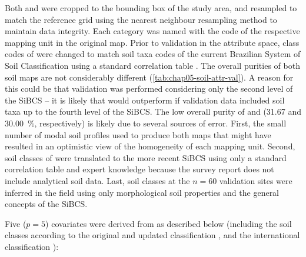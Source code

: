 Both \soilOld{} and \soilNew{} were cropped to the bounding box of the study area, and resampled to match the 
reference grid using the nearest neighbour resampling method to maintain data integrity. Each category was 
named with the code of the respective mapping unit in the original map. Prior to validation in the attribute 
space, class codes of \soilOld{} were changed to match soil 
taxa codes of the current Brazilian System of Soil Classification using a standard correlation table 
\cite{SantosEtAl2006}. The overall purities of both soil maps are not considerably different 
(\autoref{tab:chap05-soil-attr-val}). A reason for this could be that validation was performed considering 
only 
the second level of the SiBCS -- it is likely that \soilNew{} would outperform \soilOld{} if validation data 
included soil taxa up to the fourth level of the SiBCS. The low overall purity of \soilOld{} and 
\soilNew{} (\num{31.67} and \SI{30.00}{\percent}, respectively) is likely due to several sources of error. 
First, the small number of modal soil profiles used to produce both maps that might have resulted in an 
optimistic view of the homogeneity of each mapping unit. Second, soil classes of \soilOld{} were translated to 
the more recent SiBCS using only a standard correlation table \cite{SantosEtAl2006} and expert knowledge 
because the survey report does not include analytical soil data. Last, soil classes at the $n = 60$ validation 
sites were inferred in the field using only morphological soil properties and the general concepts of the 
SiBCS.

Five ($p = 5$) covariates were derived from \soilOld{} as described below (including the soil classes 
according 
to the original and updated classification \cite{AzolinEtAl1988, SantosEtAl2013a}, and the international 
classification \cite{IUSSWorkingGroupWRB2007}):

